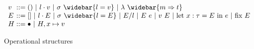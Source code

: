 \documentclass[sigplan]{acmart}
\theoremstyle{definition}
\begin{document}
\begin{figure*}
\[
  \begin{array}{l @{} l}
    v 
    &{} ::=
    \begin{array}[t]{@{} l}
      () 
      \ |\ 
      l \cdot v
      \ |\ 
      \sigma\ \widebar{l = v}
      \ |\ 
      \lambda\ \widebar{m \Rightarrow t} 
    \end{array}
    \\
    E 
    &{} ::=
    []
    \ |\ 
    l \cdot E 
    \ |\ 
    \sigma\ \widebar{l = E}
    \ |\ 
    E/l
    \ |\ 
    E\ e 
    \ |\ 
    v\ E
    \ |\ 
    \text{let } x : \tau = E\ \text{in}\ e 
    \ |\ 
    \text{fix } E 
    \\
    H 
    &{} ::=
    \bullet
    \ |\ 
    H, x \mapsto v
  \end{array}
\]
\caption{Operational structures}
\end{figure*}
  




  
\end{document}
